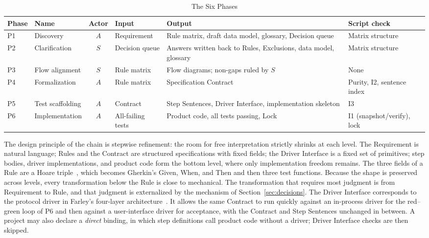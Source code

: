 \documentclass[conference]{IEEEtran}
\begin{document}
\begin{table}[t]
\caption{The Six Phases}\label{tab:phases}
\centering\footnotesize
\begin{tabularx}{\textwidth}{@{}llcLLl@{}}
\toprule
Phase & Name & Actor & Input & Output & Script check \\
\midrule
P1 & Discovery & $A$ & Requirement & Rule matrix, draft data model, glossary, Decision queue & Matrix structure \\
P2 & Clarification & $S$ & Decision queue & Answers written back to Rules, Exclusions, data model, glossary & Matrix structure \\
P3 & Flow alignment & $S$ & Rule matrix & Flow diagrams; non-gaps ruled by $S$ & None \\
P4 & Formalization & $A$ & Rule matrix & Specification Contract & Purity, I2, sentence index \\
P5 & Test scaffolding & $A$ & Contract & Step Sentences, Driver Interface, implementation skeleton & I3 \\
P6 & Implementation & $A$ & All-failing tests & Product code, all tests passing, Lock & I1 (snapshot/verify), lock \\
\bottomrule
\end{tabularx}
\end{table}

The design principle of the chain is stepwise refinement: the room for free interpretation strictly shrinks at each level. The Requirement is natural language; Rules and the Contract are structured specifications with fixed fields; the Driver Interface is a fixed set of primitives; step bodies, driver implementations, and product code form the bottom level, where only implementation freedom remains. The three fields of a Rule are a Hoare triple~\cite{hoare1969axiomatic}, which becomes Gherkin's Given, When, and Then and then three test functions. Because the shape is preserved across levels, every transformation below the Rule is close to mechanical. The transformation that requires most judgment is from Requirement to Rule, and that judgment is externalized by the mechanism of Section~\ref{sec:decisions}. The Driver Interface corresponds to the protocol driver in Farley's four-layer architecture~\cite{farley2021mse}. It allows the same Contract to run quickly against an in-process driver for the red--green loop of P6 and then against a user-interface driver for acceptance, with the Contract and Step Sentences unchanged in between. A project may also declare a \emph{direct} binding, in which step definitions call product code without a driver; Driver Interface checks are then skipped.
\end{document}
